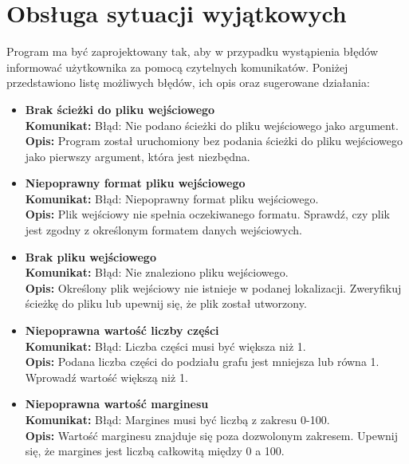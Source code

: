 \documentclass{article}
\begin{document}
\section{Obsługa sytuacji wyjątkowych}

Program ma być zaprojektowany tak, aby w przypadku wystąpienia błędów informować użytkownika za pomocą czytelnych komunikatów. Poniżej przedstawiono listę możliwych błędów, ich opis oraz sugerowane działania:

\begin{itemize}
    \item \textbf{Brak ścieżki do pliku wejściowego} \\
    \textbf{Komunikat:} Błąd: Nie podano ścieżki do pliku wejściowego jako argument. \\
    \textbf{Opis:} Program został uruchomiony bez podania ścieżki do pliku wejściowego jako pierwszy argument, która jest niezbędna.

    \item \textbf{Niepoprawny format pliku wejściowego} \\
    \textbf{Komunikat:} Błąd: Niepoprawny format pliku wejściowego. \\
    \textbf{Opis:} Plik wejściowy nie spełnia oczekiwanego formatu. Sprawdź, czy plik jest zgodny z określonym formatem danych wejściowych.

    \item \textbf{Brak pliku wejściowego} \\
    \textbf{Komunikat:} Błąd: Nie znaleziono pliku wejściowego. \\
    \textbf{Opis:} Określony plik wejściowy nie istnieje w podanej lokalizacji. Zweryfikuj ścieżkę do pliku lub upewnij się, że plik został utworzony.

    \item \textbf{Niepoprawna wartość liczby części} \\
    \textbf{Komunikat:} Błąd: Liczba części musi być większa niż 1. \\
    \textbf{Opis:} Podana liczba części do podziału grafu jest mniejsza lub równa 1. Wprowadź wartość większą niż 1.

    \item \textbf{Niepoprawna wartość marginesu} \\
    \textbf{Komunikat:} Błąd: Margines musi być liczbą z zakresu 0-100. \\
    \textbf{Opis:} Wartość marginesu znajduje się poza dozwolonym zakresem. Upewnij się, że margines jest liczbą całkowitą między 0 a 100.


\end{itemize}
\end{document}
